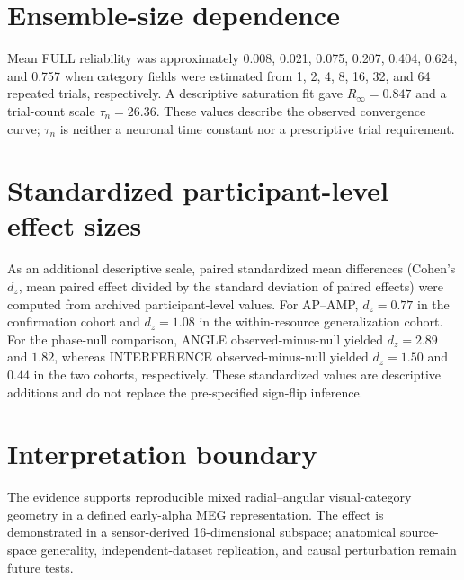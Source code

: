 \documentclass[11pt]{article}
\begin{document}
\section{Ensemble-size dependence}
Mean FULL reliability was approximately 0.008, 0.021, 0.075, 0.207, 0.404, 0.624, and 0.757 when category fields were estimated from 1, 2, 4, 8, 16, 32, and 64 repeated trials, respectively. A descriptive saturation fit gave $R_\infty=0.847$ and a trial-count scale $\tau_n=26.36$. These values describe the observed convergence curve; $\tau_n$ is neither a neuronal time constant nor a prescriptive trial requirement.

\section{Standardized participant-level effect sizes}
As an additional descriptive scale, paired standardized mean differences (Cohen's $d_z$, mean paired effect divided by the standard deviation of paired effects) were computed from archived participant-level values. For AP--AMP, $d_z=0.77$ in the confirmation cohort and $d_z=1.08$ in the within-resource generalization cohort. For the phase-null comparison, ANGLE observed-minus-null yielded $d_z=2.89$ and $1.82$, whereas INTERFERENCE observed-minus-null yielded $d_z=1.50$ and $0.44$ in the two cohorts, respectively. These standardized values are descriptive additions and do not replace the pre-specified sign-flip inference.

\section{Interpretation boundary}
The evidence supports reproducible mixed radial--angular visual-category geometry in a defined early-alpha MEG representation. The effect is demonstrated in a sensor-derived 16-dimensional subspace; anatomical source-space generality, independent-dataset replication, and causal perturbation remain future tests.
\end{document}
